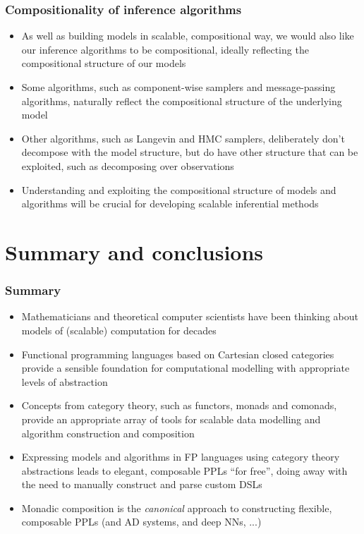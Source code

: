 \documentclass[mathserif,handout]{beamer}
\begin{document}
\begin{frame}
  \frametitle{Compositionality of inference algorithms}
  \begin{itemize}
  \item As well as building \alert{models} in scalable, compositional way, we would also like our \alert{inference algorithms} to be compositional, ideally reflecting the compositional structure of our models
  \item Some algorithms, such as component-wise samplers and message-passing algorithms, naturally reflect the compositional structure of the underlying model
  \item Other algorithms, such as Langevin and HMC samplers, deliberately don't decompose with the model structure, but do have other structure that can be exploited, such as decomposing over observations
    \item Understanding and exploiting the \alert{compositional structure} of models and algorithms will be crucial for developing scalable inferential methods
  \end{itemize}
\end{frame}



\section{Summary and conclusions}


\begin{frame}
  \frametitle{Summary}
  \begin{itemize}
  \item Mathematicians and theoretical computer scientists have been thinking about models of (scalable) computation for decades
  \item \alert{Functional programming languages} based on Cartesian closed categories provide a sensible foundation for computational modelling with appropriate levels of abstraction
  \item Concepts from \alert{category theory}, such as functors, monads and comonads, provide an appropriate array of tools for scalable data modelling and algorithm construction and composition
    \item Expressing models and algorithms in FP languages using category theory abstractions leads to \alert{elegant, composable PPLs ``for free''}, doing away with the need to manually construct and parse custom DSLs
\item Monadic composition is \alert{the} \emph{canonical} approach to constructing flexible, composable PPLs (and AD systems, and deep NNs, ...)
  \end{itemize}
\end{frame}
\end{document}
